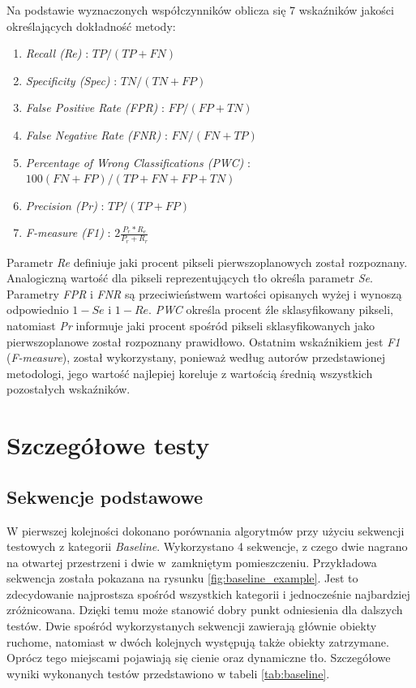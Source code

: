 \noindent Na podstawie wyznaczonych współczynników oblicza się 7 wskaźników jakości określających dokładność metody:
%
\begin{enumerate}[nolistsep]
	\item \textit{Recall (Re)} : \tab \small{$TP/(TP+FN)$}
	\item \textit{Specificity (Spec)} : \tab \small{$TN/(TN+FP)$}
	\item \textit{False Positive Rate (FPR)} : \tab \small{$FP/(FP + TN)$}
	\item \textit{False Negative Rate (FNR)} : \tab \small{$FN/(FN + TP)$}
	\item \textit{Percentage of Wrong Classifications (PWC)} : \tab \small{$100(FN + FP)/(TP + FN + FP + TN)$}
	\item \textit{Precision (Pr)} : \tab \small{$TP/(TP + FP)$}
	\item \textit{F-measure (F1)} : \tab \small{$2\frac{P_r*R_e}{P_r+R_r}$}\\
\end{enumerate}

Parametr \textit{Re} definiuje jaki procent pikseli pierwszoplanowych został rozpoznany. 
Analogiczną wartość dla pikseli reprezentujących tło określa parametr \textit{Se}. 
Parametry \textit{FPR} i \textit{FNR} są przeciwieństwem wartości opisanych wyżej i wynoszą odpowiednio $1-Se$ i $1-Re$. 
\textit{PWC} określa procent źle sklasyfikowany pikseli, natomiast \textit{Pr} informuje jaki procent spośród pikseli sklasyfikowanych jako pierwszoplanowe został rozpoznany prawidłowo. 
Ostatnim wskaźnikiem jest \textit{F1} (\textit{F-measure}), został wykorzystany, ponieważ według autorów przedstawionej metodologi, jego wartość najlepiej koreluje z wartością średnią wszystkich pozostałych wskaźników.


\section{Szczegółowe testy}
\label{sec:testy}

\subsection{Sekwencje podstawowe}
\label{subsec:sewkencje_podstawowe}

W pierwszej kolejności dokonano porównania algorytmów przy użyciu sekwencji testowych z kategorii \textit{Baseline}. 
Wykorzystano 4 sekwencje, z czego dwie nagrano na otwartej przestrzeni i dwie w~zamkniętym pomieszczeniu. 
Przykładowa sekwencja została pokazana na rysunku \ref{fig:baseline_example}. 
Jest to zdecydowanie najprostsza spośród wszystkich kategorii i jednocześnie najbardziej zróżnicowana. 
Dzięki temu może stanowić dobry punkt odniesienia dla dalszych testów. 
Dwie spośród wykorzystanych sekwencji zawierają głównie obiekty ruchome, natomiast w dwóch kolejnych występują także obiekty zatrzymane. 
Oprócz tego miejscami pojawiają się cienie oraz dynamiczne tło. 
Szczegółowe wyniki wykonanych testów przedstawiono w tabeli \ref{tab:baseline}.


